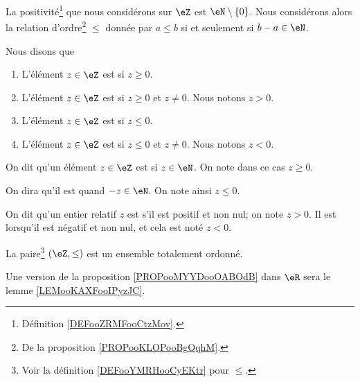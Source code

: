 \begin{definition}	\label{DEFooYMRHooCyEKtr}
	La positivité\footnote{Définition \ref{DEFooZRMFooCtzMov}.} que nous considérons sur \( \eZ\) est \( \eN\setminus\{ 0 \}\). Nous considérons alors la relation d'ordre\footnote{De la proposition \ref{PROPooKLOPooBgQqhM}.} \( \leq\) donnée par \( a\leq b\) si et seulement si \( b-a\in \eN\).

	Nous disons que
	\begin{enumerate}
		\item
		      L'élément \( z\in \eZ\) est  si \( z\geq 0\).
		\item
		      L'élément \( z\in \eZ\) est  si \( z\geq 0\) et \( z\neq 0\). Nous notons \( z>0\).
		\item
		      L'élément \( z\in \eZ\) est  si \( z\leq 0\).
		\item
		      L'élément \( z\in \eZ\) est  si \( z\leq 0\) et \( z\neq 0\). Nous notons \( z<0\).
	\end{enumerate}
\end{definition}

\begin{definition}	\label{DEFooRelatifsPositifs}
	On dit qu'un élément \( z \in \eZ \) est  si \( z \in \eN \). On note dans ce cas \( z \geq 0\).

	On dira qu'il est  quand \( -z \in \eN \). On note ainsi \( z \leq 0 \).

	On dit qu'un entier relatif \( z \) est  s'il est positif et non nul; on note \( z > 0 \). Il est  lorsqu'il est négatif et non nul, et cela est noté \( z < 0 \).
\end{definition}

\begin{propositionDef}       \label{PROPooMYYDooOABOdB}
	La paire\footnote{Voir la définition \ref{DEFooYMRHooCyEKtr} pour \( \leq\).} \( (\eZ, \leq)\) est un ensemble totalement ordonné.
\end{propositionDef}

\begin{normaltext}
	Une version de la proposition \ref{PROPooMYYDooOABOdB} dans \( \eR\) sera le lemme \ref{LEMooKAXFooIPyzJC}.
\end{normaltext}

